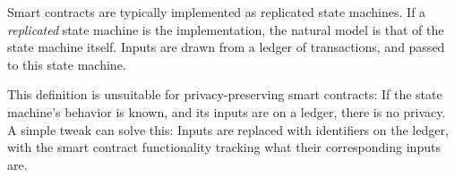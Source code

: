 Smart contracts are typically implemented as replicated state machines. If a
\emph{replicated} state machine is the implementation, the natural model is that
of the state machine itself. Inputs are drawn from a ledger of transactions, and
passed to this state machine.

This definition is unsuitable for privacy-preserving smart contracts: If the
state machine's behavior is known, and its inputs are on a ledger, there is no
privacy. A simple tweak can solve this: Inputs are replaced with identifiers on
the ledger, with the smart contract functionality tracking what their
corresponding inputs are.

